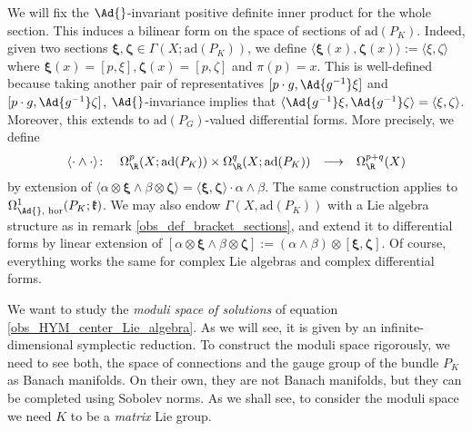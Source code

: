 We will fix the \(\Ad{}\)-invariant positive definite inner product for the whole section. This induces a bilinear form on the space of sections of \(\mathrm{ad}(P_K)\). Indeed, given two sections \(\bm{\xi}, \bm{\zeta}\in \Gamma(X; \mathrm{ad}(P_K))\), we define \(\langle \bm{\xi}(x), \bm{\zeta}(x)\rangle :=\langle \xi, \zeta \rangle\) where \(\bm{\xi}(x)=[p, \xi], \bm{\zeta}(x)=[p, \zeta]\) and \(\pi(p)=x\). This is well-defined because taking another pair of representatives \([p\cdot g, \Ad{g^{-1}}\xi]\) and \([p\cdot g, \Ad{g^{-1}}\zeta]\), \(\Ad{}\)-invariance implies that \(\langle \Ad{g^{-1}}\xi, \Ad{g^{-1}}\zeta \rangle = \langle \xi, \zeta\rangle\). Moreover, this extends to \(\mathrm{ad}(P_G)\)-valued differential forms. More precisely, we define 
    \[
    \begin{array}{cccc}
        \langle \cdot \wedge \cdot \rangle \colon & \Omega_\R^p(X; \mathrm{ad}(P_K)) \times \Omega_\R^q(X; \mathrm{ad}(P_K)) & \longrightarrow & \Omega_\R^{p+q}(X) \\ 
    \end{array}
    \]
by extension of \(\langle \alpha \otimes \bm{\xi} \wedge \beta \otimes \bm{\zeta}\rangle = \langle \bm{\xi}, \bm{\zeta}\rangle \cdot \alpha \wedge \beta\). The same construction applies to \(\Omega_{\Ad{}, \text{ hor}}^1(P_K;\mathfrak{k})\). We may also endow \(\Gamma(X, \mathrm{ad}(P_K))\) with a Lie algebra structure as in remark \ref{obs_def_bracket_sections}, and extend it to differential forms by linear extension of \([\alpha \otimes \bm{\xi} \wedge \beta \otimes \bm{\zeta}]:=(\alpha \wedge \beta)\otimes [\bm{\xi}, \bm{\zeta}]\). Of course, everything works the same for complex Lie algebras and complex differential forms.

We want to study the \textit{moduli space of solutions} of equation \eqref{obs_HYM_center_Lie_algebra}. As we will see, it is given by an infinite-dimensional symplectic reduction. To construct the moduli space rigorously, we need to see both, the space of connections and the gauge group of the bundle \(P_K\) as Banach manifolds. On their own, they are not Banach manifolds, but they can be completed using Sobolev norms. As we shall see, to consider the moduli space we need \(K\) to be a \textit{matrix} Lie group. 

